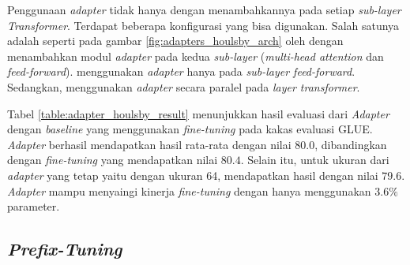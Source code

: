 Penggunaan \textit{adapter} tidak hanya dengan menambahkannya pada setiap \textit{sub-layer Transformer}. Terdapat beberapa konfigurasi yang bisa digunakan. Salah satunya adalah seperti pada gambar \ref{fig:adapters_houlsby_arch} oleh \parencite{adapter_houlsby} dengan menambahkan modul \textit{adapter} pada kedua \textit{sub-layer} (\textit{multi-head attention} dan \textit{feed-forward}). \citeauthor{adapter_pfeiffer} menggunakan \textit{adapter} hanya pada \textit{sub-layer feed-forward}. Sedangkan, \citeauthor{uvpl} menggunakan \textit{adapter} secara paralel pada \textit{layer transformer}.

\begin{table}[h]
    \vspace{0.25cm}
    \centering
    \caption{Hasil evaluasi \textit{Adapter} konfigurasi \citeauthor{adapter_houlsby} pada GLUE \parencite{adapter_houlsby}}
    \label{table:adapter_houlsby_result}
\end{table}

Tabel \ref{table:adapter_houlsby_result} menunjukkan hasil evaluasi dari \textit{Adapter} dengan \textit{baseline} yang menggunakan \textit{fine-tuning} pada kakas evaluasi GLUE. \textit{Adapter} berhasil mendapatkan hasil rata-rata dengan nilai $80.0$, dibandingkan dengan \textit{fine-tuning} yang mendapatkan nilai $80.4$. Selain itu, untuk ukuran dari \textit{adapter} yang tetap yaitu dengan ukuran 64, mendapatkan hasil dengan nilai $79.6$. \textit{Adapter} mampu menyaingi kinerja \textit{fine-tuning} dengan hanya menggunakan $3.6\%$ parameter.

\subsection{\textit{Prefix-Tuning}}
\label{sec:prefix-tuning}

